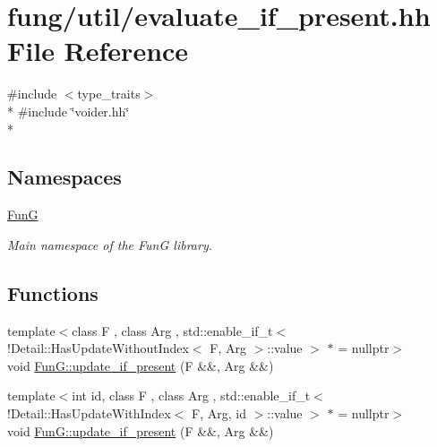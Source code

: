 \hypertarget{evaluate__if__present_8hh}{}\section{fung/util/evaluate\+\_\+if\+\_\+present.hh File Reference}
\label{evaluate__if__present_8hh}
{\ttfamily \#include $<$type\+\_\+traits$>$}\\*
{\ttfamily \#include \char`\"{}voider.\+hh\char`\"{}}\\*
\subsection*{Namespaces}
\begin{DoxyCompactItemize}
\item 
 \hyperlink{namespaceFunG}{FunG}
\begin{DoxyCompactList}\small\item\em Main namespace of the FunG library. \end{DoxyCompactList}\end{DoxyCompactItemize}
\subsection*{Functions}
\begin{DoxyCompactItemize}
\item 
{\footnotesize template$<$class F , class Arg , std\+::enable\+\_\+if\+\_\+t$<$!\+Detail\+::\+Has\+Update\+Without\+Index$<$ F, Arg $>$\+::value $>$ $\ast$  = nullptr$>$ }\\void \hyperlink{namespaceFunG_a3b9d2e5d07b30c2ee26703b33e9adb9e}{Fun\+G\+::update\+\_\+if\+\_\+present} (F \&\&, Arg \&\&)
\item 
{\footnotesize template$<$int id, class F , class Arg , std\+::enable\+\_\+if\+\_\+t$<$!\+Detail\+::\+Has\+Update\+With\+Index$<$ F, Arg, id $>$\+::value $>$ $\ast$  = nullptr$>$ }\\void \hyperlink{namespaceFunG_aed5ddbef97c98202e818bca2b74c75d2}{Fun\+G\+::update\+\_\+if\+\_\+present} (F \&\&, Arg \&\&)
\end{DoxyCompactItemize}
